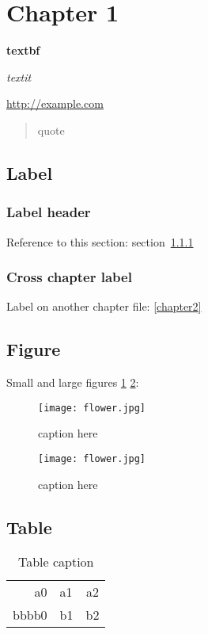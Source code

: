 \section{Chapter 1}

\textbf{textbf}

\textit{textit}

\url{http://example.com}

\begin{quote}
  quote
\end{quote}

\subsection{Label}

  \subsubsection{Label header} \label{label-header}

    Reference to this section: section~\ref{label-header}

  \subsubsection{Cross chapter label}

    Label on another chapter file: \ref{chapter2}

\subsection{Figure}

  Small and large figures \ref{fig-small} \ref{fig-large}:

  \begin{figure}[htb]
    \texttt{[image: flower.jpg]}
    \caption{caption here}
    \label{fig-small}
  \end{figure}

  \begin{figure}[htb]
    \texttt{[image: flower.jpg]}
    \caption{caption here}
    \label{fig-large}
  \end{figure}

\subsection{Table}

  \begin{table}
    \caption{Table caption}
    \label{table}
    \begin{tabular}{rlc}
      \hline
      a0    & a1 & a2 \\
      bbbb0 & b1 & b2 \\
      \hline
    \end{tabular}
  \end{table}

